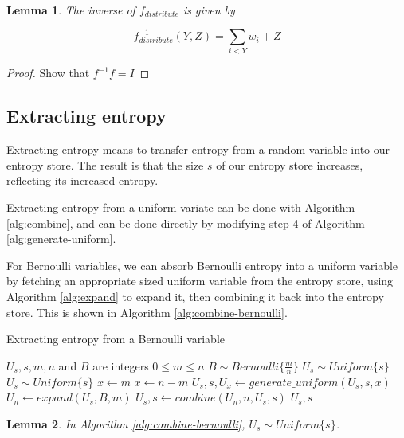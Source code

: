\documentclass[12pt]{article}
\newtheorem{lemma}{Lemma}
\begin{document}
\begin{lemma}
The inverse of $f_{distribute}$ is given by

    \begin{equation}
    f^{-1}_{distribute}(Y,Z) = \sum_{i<Y}w_i + Z
    \end{equation}
\end{lemma}

\begin{proof}
    Show that $f^{-1}f= I$

\end{proof}

\subsection {Extracting entropy}

Extracting entropy means to transfer entropy from a random variable into our entropy store. The result is that the size $s$ of our entropy store increases, reflecting its increased entropy.

Extracting entropy from a uniform variate can be done with Algorithm \ref{alg:combine}, and can be done directly by modifying step 4 of Algorithm \ref{alg:generate-uniform}.

For Bernoulli variables, we can absorb Bernoulli entropy into a uniform variable by fetching an appropriate sized uniform variable from the entropy store, using Algorithm \ref{alg:expand} to expand it, then combining it back into the entropy store. This is shown in Algorithm \ref{alg:combine-bernoulli}.

\begin{algorithm}
\caption{Extracting entropy from a Bernoulli variable}
\label{alg:combine-bernoulli}
\begin{algorithmic}[1]
    \Require $U_s, s, m, n$ and $B$ are integers
    \Require $0 \le m \le n$
    \Require $B \sim Bernoulli\{\frac{m}{n}\}$
    \Require $U_s \sim Uniform\{s\}$
    \Ensure $U_s \sim Uniform\{s\}$
        \State $x \gets m$
    \Else
        \State $x \gets n-m$
    \EndIf
    \State $U_s, s, U_x \gets generate\_uniform(U_s, s, x)$
    \State $U_n \gets expand(U_s, B, m)$
    \State $U_s, s \gets combine(U_n, n, U_s, s)$
    \State \Return $U_s, s$
\EndProcedure
\end{algorithmic}
\end{algorithm}

\begin{lemma}
In Algorithm \ref{alg:combine-bernoulli}, $U_s \sim Uniform\{s\}$.
\end{lemma}
\end{document}
